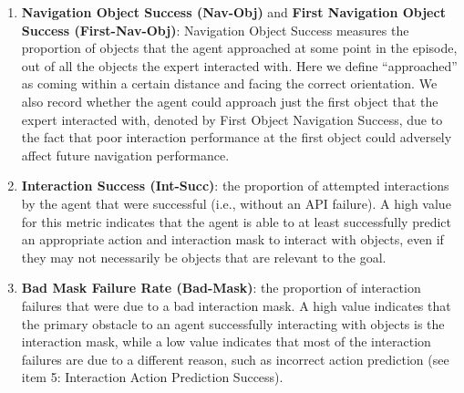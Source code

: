 \documentclass[11pt,a4paper]{article}
\begin{document}
\begin{enumerate}
    \item \textbf{Navigation Object Success (Nav-Obj)} and \textbf{First Navigation Object Success (First-Nav-Obj)}: Navigation Object Success measures the proportion of objects that the agent approached at some point in the episode, out of all the objects the expert interacted with. Here we define ``approached'' as coming within a certain distance and facing the correct orientation. We also record whether the agent could approach just the first object that the expert interacted with, denoted by First Object Navigation Success, due to the fact that poor interaction performance at the first object could adversely affect future navigation performance.
    

    
    \item \textbf{Interaction Success (Int-Succ)}: the proportion of attempted interactions by the agent that were successful (i.e., without an API failure). A high value for this metric indicates that the agent is able to at least successfully predict an appropriate action and interaction mask to interact with objects, even if they may not necessarily be objects that are relevant to the goal.
    
    \item \textbf{Bad Mask Failure Rate (Bad-Mask)}: the proportion of interaction failures that were due to a bad interaction mask. A high value indicates that the primary obstacle to an agent successfully interacting with objects is the interaction mask, while a low value indicates that most of the interaction failures are due to a different reason, such as incorrect action prediction (see item 5: Interaction Action Prediction Success).


\end{enumerate}
\end{document}
